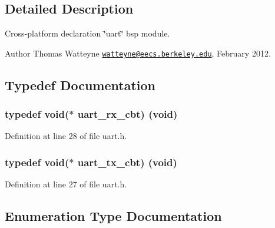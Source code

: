 \subsection{Detailed Description}
Cross-\/platform declaration \char`\"{}uart\char`\"{} bsp module. 

\begin{DoxyAuthor}{Author}
Thomas Watteyne \href{mailto:watteyne@eecs.berkeley.edu}{\tt watteyne@eecs.\+berkeley.\+edu}, February 2012. 
\end{DoxyAuthor}


\subsection{Typedef Documentation}
\subsubsection[{\texorpdfstring{uart\+\_\+rx\+\_\+cbt}{uart_rx_cbt}}]{\setlength{\rightskip}{0pt plus 5cm}typedef {\bf void}($\ast$ uart\+\_\+rx\+\_\+cbt) ({\bf void})}\hypertarget{group__uart_gab8f8d6449d6a994dfb5ede3fca7ac4e2}{}\label{group__uart_gab8f8d6449d6a994dfb5ede3fca7ac4e2}


Definition at line 28 of file uart.\+h.

\subsubsection[{\texorpdfstring{uart\+\_\+tx\+\_\+cbt}{uart_tx_cbt}}]{\setlength{\rightskip}{0pt plus 5cm}typedef {\bf void}($\ast$ uart\+\_\+tx\+\_\+cbt) ({\bf void})}\hypertarget{group__uart_gae005b96f0b18aecb814f4979c3e33408}{}\label{group__uart_gae005b96f0b18aecb814f4979c3e33408}


Definition at line 27 of file uart.\+h.



\subsection{Enumeration Type Documentation}
